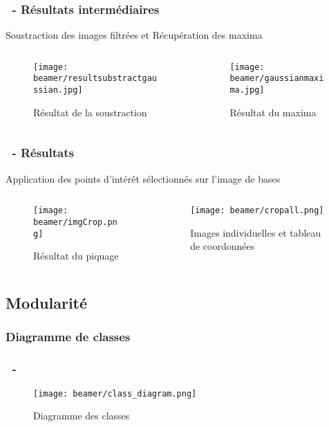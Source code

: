 \documentclass[11pt]{beamer}
\begin{document}
\begin{frame}
\frametitle{\subsecname ~- Résultats intermédiaires}
Soustraction des images filtrées et Récupération des maxima
\begin{columns}
\begin{column}{5cm}
			\begin{figure}
				\texttt{[image: beamer/resultsubstractgaussian.jpg]}
				
				Résultat de la soustraction
			\end{figure}
\end{column}
\begin{column}{5cm}
			\begin{figure}
				\texttt{[image: beamer/gaussianmaxima.jpg]}
				
				Résultat du maxima
			\end{figure}
\end{column}
\end{columns}
\end{frame}
\begin{frame}
\frametitle{\subsecname ~- Résultats}
Application des points d'intérêt sélectionnés sur l'image de bases
	\begin{columns}
		\begin{column}{5cm}
			\begin{figure}
				\texttt{[image: beamer/imgCrop.png]}
				
				Résultat du piquage
			\end{figure}
		\end{column}
		\begin{column}{5cm}
			\begin{figure}
				\texttt{[image: beamer/cropall.png]}
				
				Images individuelles et tableau de coordonnées
			\end{figure}
		\end{column}
	\end{columns}
\end{frame}
\subsection{Modularité}
\subsubsection*{Diagramme de classes}
\begin{frame}
\frametitle{\subsecname ~- \subsubsecname}
	\begin{figure}
		\texttt{[image: beamer/class\_diagram.png]}
				
		Diagramme des classes
	\end{figure}
\end{frame}
\end{document}
